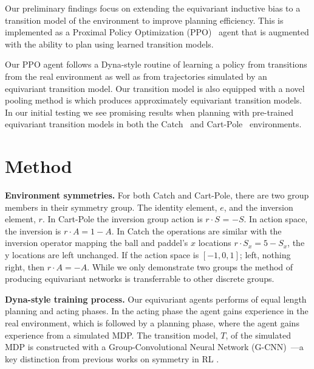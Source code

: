 \documentclass[mlabstract]{jmlr}
\begin{document}
Our preliminary findings focus on extending the equivariant inductive bias to a transition model of the environment to improve planning efficiency. This is implemented as a Proximal Policy Optimization (PPO)~\cite{schulman2017proximal} agent that is augmented with the ability to plan using learned transition models.

Our PPO agent follows a Dyna-style routine of learning a policy from transitions from the real environment as well as from trajectories simulated by an equivariant transition model. Our transition model is also equipped with a novel pooling method is which produces approximately equivariant transition models. In our initial testing we see promising results when planning with pre-trained equivariant transition models in both the Catch~\cite{osband2020bsuite} and Cart-Pole~\cite{barto1983neuronlike, florian2007correct} environments.

\vspace{-10}
\section{Method}
\indent \indent \textbf{Environment symmetries.} For both Catch and Cart-Pole, there are two group members in their symmetry group. The identity element, $e$, and the inversion element, $r$. In Cart-Pole the inversion group action is $r \cdot S$ = $ - S$. In action space, the inversion is $r \cdot A = 1 - A$. In Catch the operations are similar with the inversion operator mapping the ball and paddel's $x$ locations $r \cdot S_x = 5- S_x$, the y locations are left unchanged. If the action space is $[-1, 0, 1]$; left, nothing right, then $r \cdot A = - A$. While we only demonstrate two groups the method of producing equivariant networks is transferrable to other discrete groups.

\textbf{Dyna-style training process.} Our equivariant agents performs of equal length planning and acting phases. In the acting phase the agent gains experience in the real environment, which is followed by a planning phase, where the agent gains experience from a simulated MDP. The transition model, $T$, of the simulated MDP is constructed with a Group-Convolutional Neural Network (G-CNN)~\cite{cohen2016group}---a key distinction from previous works on symmetry in RL \cite{van2020mdp}.
\end{document}
